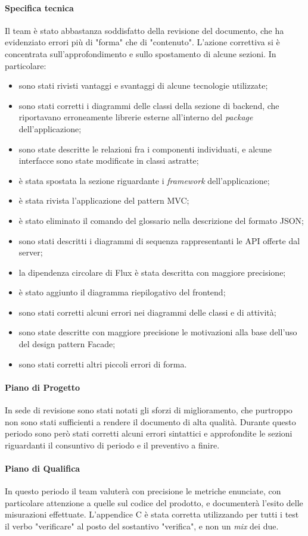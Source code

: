 \paragraph*{Specifica tecnica}
Il team è stato abbastanza soddisfatto della revisione del documento, che ha evidenziato errori più di "forma" che di "contenuto". L'azione correttiva si è concentrata sull'approfondimento e sullo spostamento di alcune sezioni. In particolare:
\begin{itemize}
\item sono stati rivisti vantaggi e svantaggi di alcune tecnologie utilizzate;
\item sono stati corretti i diagrammi delle classi della sezione di backend, che riportavano erroneamente librerie esterne all'interno del \textit{package} dell'applicazione;
\item sono state descritte le relazioni fra i componenti individuati, e alcune interfacce sono state modificate in classi astratte;
\item è stata spostata la sezione riguardante i \textit{framework} dell'applicazione;
\item è stata rivista l'applicazione del pattern MVC;
\item è stato eliminato il comando del glossario nella descrizione del formato JSON;
\item sono stati descritti i diagrammi di sequenza rappresentanti le API offerte dal server;
\item la dipendenza circolare di Flux è stata descritta con maggiore precisione;
\item è stato aggiunto il diagramma riepilogativo del frontend;
\item sono stati corretti alcuni errori nei diagrammi delle classi e di attività;
\item sono state descritte con maggiore precisione le motivazioni alla base dell'uso del design pattern Facade;
\item sono stati corretti altri piccoli errori di forma.
\end{itemize}

\paragraph*{Piano di Progetto}
In sede di revisione sono stati notati gli sforzi di miglioramento, che purtroppo non sono stati sufficienti a rendere il documento di alta qualità. Durante questo periodo sono però stati corretti alcuni errori sintattici e approfondite le sezioni riguardanti il consuntivo di periodo e il preventivo a finire.

\paragraph*{Piano di Qualifica}
In questo periodo il team valuterà con precisione le metriche enunciate, con particolare attenzione a quelle sul codice del prodotto, e documenterà l'esito delle misurazioni effettuate. L'appendice C è stata corretta utilizzando per tutti i test il verbo "verificare" al posto del sostantivo "verifica", e non un \textit{mix} dei due.
